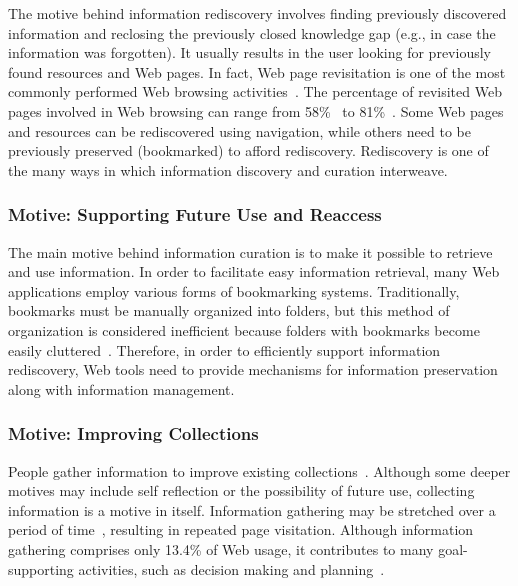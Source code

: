 \documentclass[review]{elsarticle}
\begin{document}
{{{The motive behind information rediscovery involves finding previously discovered information and reclosing the previously closed knowledge gap (e.g., in case the information was forgotten). It usually results in the user looking for previously found resources and Web pages. In fact, Web page revisitation is one of the most commonly performed Web browsing activities~\cite{adar2008large,cockburn2003improving}. The percentage of revisited Web pages involved in Web browsing can range from 58\%~\cite{tauscher1997people} to 81\%~\cite{cockburn2001web}. 
Some Web pages and resources can be rediscovered using navigation, while others need to be previously preserved (bookmarked) to afford rediscovery. Rediscovery is one of the many ways in which information discovery and curation interweave. 
}

{\subsubsection{Motive: Supporting Future Use and Reaccess}
The main motive behind information curation is to make it possible to retrieve and use information. In order to facilitate easy information retrieval, many Web applications employ various forms of bookmarking systems. Traditionally, bookmarks must be manually organized into folders, but this method of organization is considered inefficient because folders with bookmarks become easily cluttered~\cite{abrams1998information}. Therefore, in order to efficiently support information rediscovery, Web tools need to provide mechanisms for information preservation along with information management.
}

{\subsubsection{Motive: Improving Collections}
People gather information to improve existing collections~\cite{lindley2012s}. Although some deeper motives may include self reflection or the possibility of future use, collecting information is a motive in itself. Information gathering may be stretched over a period of time~\cite{kellar2006goal}, resulting in repeated page visitation. Although information gathering comprises only 13.4\% of Web usage, it contributes to many goal-supporting activities, such as decision making and planning~\cite{kellar2006goal}.

}}}
\end{document}
